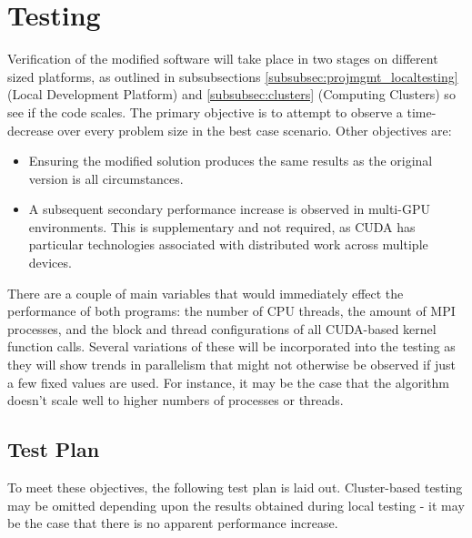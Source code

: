 \documentclass[conference]{IEEEtran}
\begin{document}

\section{Testing}
\label{sec:testing}

Verification of the modified software will take place in two stages on different sized platforms, as outlined in subsubsections \ref{subsubsec:projmgmt_localtesting} (Local Development Platform) and \ref{subsubsec:clusters} (Computing Clusters) so see if the code scales. The primary objective is to attempt to observe a time-decrease over every problem size in the best case scenario. Other objectives are:

\begin{itemize}
    \item Ensuring the modified solution produces the same results as the original version is all circumstances.
    \item A subsequent secondary performance increase is observed in multi-GPU environments. This is supplementary and not required, as CUDA has particular technologies associated with distributed work across multiple devices.   
\end{itemize}

There are a couple of main variables that would immediately effect the performance of both programs: the number of CPU threads, the amount of MPI processes, and the block and thread configurations of all CUDA-based kernel function calls. Several variations of these will be incorporated into the testing as they will show trends in parallelism that might not otherwise be observed if just a few fixed values are used. For instance, it may be the case that the algorithm doesn't scale well to higher numbers of processes or threads.

\subsection{Test Plan}
\label{subsec:testplan}

To meet these objectives, the following test plan is laid out. Cluster-based testing may be omitted depending upon the results obtained during local testing - it may be the case that there is no apparent performance increase.
\end{document}
